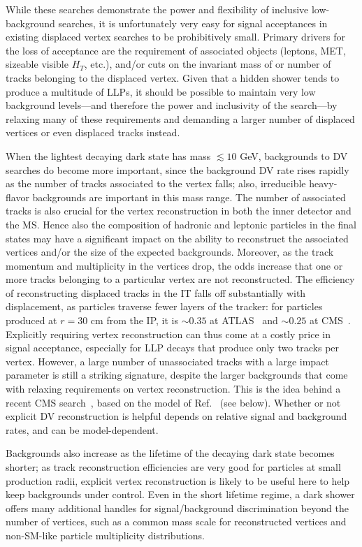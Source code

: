 While these searches demonstrate the power and flexibility of inclusive low-background searches, it is unfortunately very easy for signal acceptances in  existing displaced vertex searches to be prohibitively small.  Primary drivers for the loss of acceptance are the requirement of associated objects (leptons, MET, sizeable visible $H_T$, etc.), and/or cuts on the invariant mass of or number of tracks belonging to the displaced vertex. Given that a hidden shower tends to produce a multitude of LLPs, it should be possible to maintain very low background levels---and therefore the power and inclusivity of the search---by relaxing many of these requirements and demanding a larger number of displaced vertices or even displaced tracks instead.

When the lightest decaying dark state has mass $\lesssim 10$ GeV, backgrounds to DV searches do become more important,  since the background DV rate rises rapidly as the number of tracks associated to the vertex falls; also, irreducible heavy-flavor backgrounds are important in this mass range. The number of associated tracks is also crucial for the vertex reconstruction in both the inner detector and the MS. Hence also the composition of hadronic and leptonic particles in the final states may have a significant impact on the ability to reconstruct the associated vertices and/or the size of the expected backgrounds. Moreover, as the track momentum and multiplicity in the vertices drop, the odds increase that one or more tracks belonging to a particular vertex are not reconstructed.
The efficiency of reconstructing displaced tracks in the IT falls off substantially with displacement, as particles traverse fewer layers of the tracker: for particles produced at $r=30$ cm  from the IP, it is $\sim 0.35$ at ATLAS~\cite{ATL-PHYS-PUB-2017-014} and $\sim 0.25$ at CMS~\cite{Rovere:2134627}.  Explicitly requiring vertex reconstruction can thus come at a costly price in signal acceptance, especially for LLP decays that produce only two tracks per vertex. However, a large number of unassociated tracks with a large impact parameter is still a striking signature, despite the larger backgrounds that come with relaxing requirements on vertex reconstruction.   This is the idea behind a recent CMS search~\cite{Sirunyan:2018njd}, based on the model of Ref.~\cite{Schwaller:2015gea} (see below).  Whether or not explicit DV reconstruction is helpful depends on relative signal and background rates, and can be model-dependent.

Backgrounds also increase as the lifetime of the decaying dark state becomes shorter; as track reconstruction efficiencies are very good for particles at small production radii, explicit vertex reconstruction is likely to be useful here to help keep backgrounds under control.  Even in the short lifetime regime, a dark shower offers many additional handles for signal/background discrimination beyond the number of vertices, such as a common mass scale for reconstructed vertices and non-SM-like particle multiplicity distributions.


